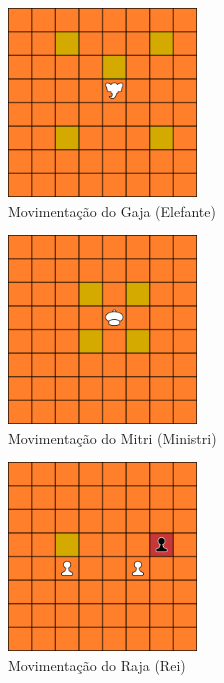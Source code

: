 \documentclass{article}
\begin{document}
    \begin{figure}[h]
    \centering
    \includegraphics[width=5cm]{imgs/gaja_moves.png}
    \caption{Movimentação do Gaja (Elefante)}
    \label{figura:gaja_moves}
    \end{figure}
    
    \begin{figure}[h]
    \centering
    \includegraphics[width=5cm]{imgs/mitri_moves.png}
    \caption{Movimentação do Mitri (Ministri)}
    \label{figura:mitri_moves}
    \end{figure}

    \begin{figure}[h]
    \centering
    \includegraphics[width=5cm]{imgs/padati_moves.png}
    \caption{Movimentação do Raja (Rei)}
    \label{figura:raja_moves}
    \end{figure}
\end{document}
